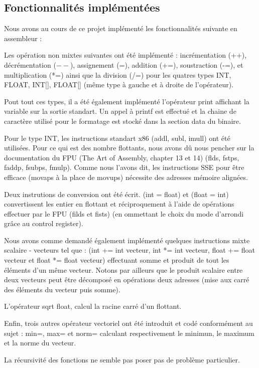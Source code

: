 \documentclass[a4paper, 11pt]{article}
\begin{document}
\subsection{Fonctionnalités implémentées}

Nous avons au cours de ce projet implémenté les fonctionnalités suivante en assembleur :

Les opération non mixtes suivantes ont été implémenté : 
incrémentation (++), décrémentation ($--$), assignement (=), addition (+=), soustraction (-=), et multiplication (*=) ainsi que la division (/=)
pour les quatres types INT, FLOAT, INT[], FLOAT[] (même type à gauche et à droite de l'opérateur).

Pout tout ces types, il a été également implémenté l'opérateur print affichant la variable sur la sortie standart. Un appel à printf est effectué et 
la chaine de caractère utilisé pour le formatage est stocké dans la section data du binaire.

Pour le type INT, les instructions standart x86 (addl, subl, imull) ont été utilisées. Pour ce qui est des nombre flottants, nous avons dû nous
pencher sur la documentation du FPU (The Art of Assembly, chapter 13 et 14) (flds, fstps, faddp, fsubps, fmulp).
Comme nous l'avons dit, les instructions SSE pour être efficace (movaps à la place de movups) nécessite des adresses mémoire alignées.

Deux instrutions de conversion ont été écrit. (int = float) et (float = int) convertissent les entier en flottant et réciproquement à l'aide
de opérations effectuer par le FPU (filds et fists) (en ommettant le choix du mode d'arrondi grâce au control register).

Nous avons comme demandé également implémenté quelques instructions mixte scalaire - vecteurs tel que :
(int += int vecteur, int *= int vecteur, float += float vecteur et float *= float vecteur) effectuant somme et produit de tout les éléments
d'un même vecteur. Notons par ailleurs que le produit scalaire entre deux vecteurs peut être décomposé en opérations deux adresses 
(mise aux carré des éléments du vecteur puis somme).

L'opérateur sqrt float, calcul la racine carré d'un flottant.

Enfin, trois autres opérateur vectoriel ont été introduit et codé conformément au sujet : min=, max= et norm= calculant respectivement
le minimun, le maximum et la norme du vecteur.

La récursivité des fonctions ne semble pas poser pas de problème particulier.
\end{document}
